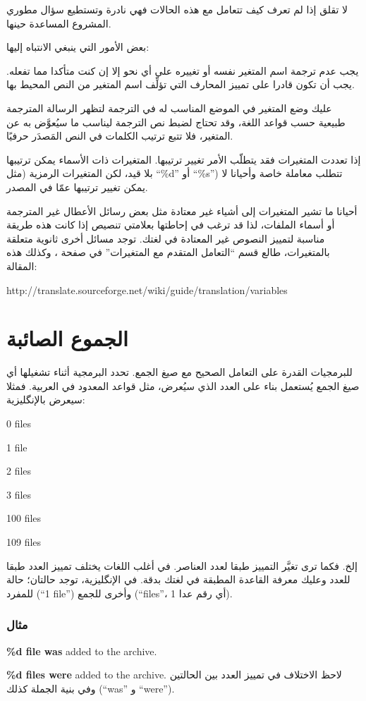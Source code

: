لا تقلق إذا لم تعرف كيف تتعامل مع هذه الحالات فهي نادرة وتستطيع سؤال
مطوري المشروع المساعدة حينها.

بعض الأمور التي ينبغي الانتباه إليها:

\startitemize[1]
\item يجب عدم ترجمة اسم المتغير نفسه أو تغييره على أي نحو إلا إن كنت
متأكدا مما تفعله. يجب أن تكون قادرا على تمييز المحارف التي تؤلِّف اسم
المتغير من النص المحيط بها.
\item عليك وضع المتغير في الموضع المناسب له في الترجمة لتظهر الرسالة
المترجمة طبيعية حسب قواعد اللغة، وقد تحتاج لضبط نص الترجمة ليناسب ما
سيُعوَّض به عن المتغير، فلا تتبع ترتيب الكلمات في النص المَصدَر حرفيًا.
\item إذا تعددت المتغيرات فقد يتطلّب الأمر تغيير ترتيبها. المتغيرات ذات
الأسماء يمكن ترتيبها بلا قيد، لكن المتغيرات الرمزية (مثل “‪\%d‬” أو
“‪\%s‬”) تتطلب معاملة خاصة وأحيانا لا يمكن تغيير ترتيبها عمّا في
المصدر.
\item أحيانا ما تشير المتغيرات إلى أشياء غير معتادة مثل بعض رسائل
الأعطال غير المترجمة أو أسماء الملفات، لذا قد ترغب في إحاطتها بعلامتي
تنصيص إذا كانت هذه طريقة مناسبة لتمييز النصوص غير المعتادة في لغتك.
\stopitemize
توجد مسائل أخرى ثانوية متعلقة بالمتغيرات، طالع قسم “التعامل المتقدم مع
المتغيرات” في صفحة \at[ref:43252826]، وكذلك هذه المقالة:

http://translate.sourceforge.net/wiki/guide/translation/variables

\section[ref:33482409]{الجموع الصائبة}
للبرمجيات القدرة على التعامل
الصحيح مع صيغ الجمع. تحدد البرمجية أثناء تشغيلها أي صيغ الجمع يُستعمل
بناء على العدد الذي سيُعرض، مثل قواعد المعدود في العربية. فمثلا سيعرض
بالإنگليزية:

\startitemize[1]
\item 0 files
\item 1 file
\item 2 files
\item 3 files
\item 100 files
\item 109 files
\item إلخ.
\stopitemize
فكما ترى تغيَّر التمييز طبقا لعدد العناصر. في أغلب اللغات يختلف تمييز
العدد طبقا للعدد وعليك معرفة القاعدة المطبقة في لغتك بدقة. في
الإنگليزية، توجد حالتان؛ حالة للمفرد (“1 file”) وأخرى للجمع (“files”،
أي رقم عدا 1).

\subsubsection{مثال}
\startitemize[1]
\item {\bf \%d file was} added to the archive.
\item {\bf \%d files were} added to the archive.
\stopitemize
لاحظ الاختلاف في تمييز العدد بين الحالتين وفي بنية الجملة كذلك (“was” و
“were”).

